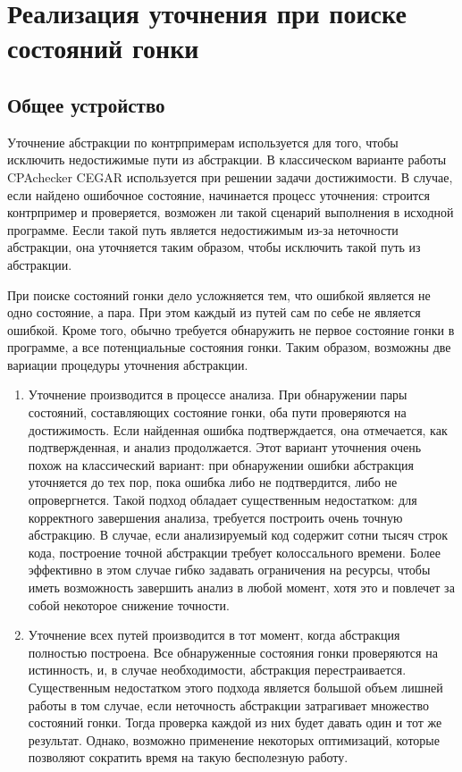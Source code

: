 \section{Реализация уточнения при поиске состояний гонки}
\label{sect_impl_refinement}

\subsection{Общее устройство}
Уточнение абстракции по контрпримерам используется для того, чтобы исключить недостижимые пути из абстракции.
В классическом варианте работы CPAchecker CEGAR используется при решении задачи достижимости.
В случае, если найдено ошибочное состояние, начинается процесс уточнения: строится контрпример и проверяется, возможен ли такой сценарий выполнения в исходной программе.
Еесли такой путь является недостижимым из-за неточности абстракции, она уточняется таким образом, чтобы исключить такой путь из абстракции. 

При поиске состояний гонки дело усложняется тем, что ошибкой является не одно состояние, а пара. При этом каждый из путей сам по себе не является ошибкой.
Кроме того, обычно требуется обнаружить не первое состояние гонки в программе, а все потенциальные состояния гонки. 
Таким образом, возможны две вариации процедуры уточнения абстракции.

\begin{enumerate}
\item Уточнение производится в процессе анализа. При обнаружении пары состояний, составляющих состояние гонки, оба пути проверяются на достижимость.
Если найденная ошибка подтверждается, она отмечается, как подтвержденная, и анализ продолжается.
Этот вариант уточнения очень похож на классический вариант: при обнаружении ошибки абстракция уточняется до тех пор, пока ошибка либо не подтвердится, либо не опровергнется.
Такой подход обладает существенным недостатком: для корректного завершения анализа, требуется построить очень точную абстракцию. 
В случае, если анализируемый код содержит сотни тысяч строк кода, построение точной абстракции требует колоссального времени. 
Более эффективно в этом случае гибко задавать ограничения на ресурсы, чтобы иметь возможность завершить анализ в любой момент, хотя это и повлечет за собой некоторое снижение точности. 

\item Уточнение всех путей производится в тот момент, когда абстракция полностью построена.
Все обнаруженные состояния гонки проверяются на истинность, и, в случае необходимости, абстракция перестраивается. 
Существенным недостатком этого подхода является большой объем лишней работы в том случае, если неточность абстракции затрагивает множество состояний гонки.
Тогда проверка каждой из них будет давать один и тот же результат.
Однако, возможно применение некоторых оптимизаций, которые позволяют сократить время на такую бесполезную работу. 

\end{enumerate}

